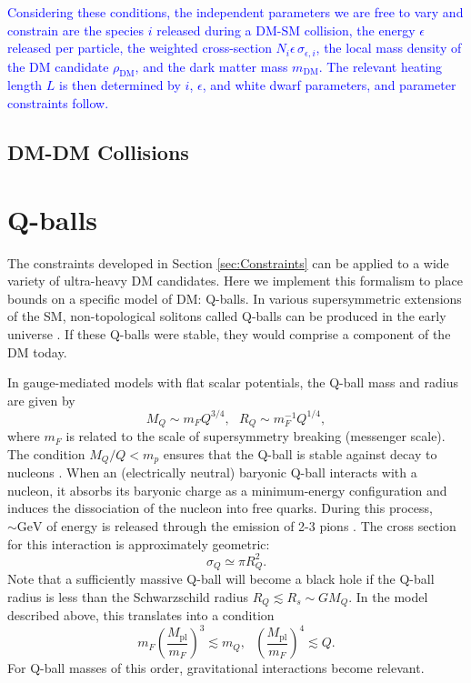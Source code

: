 \documentclass[twocolumn,showpacs,preprintnumbers,amsmath,amssymb,prd]{revtex4}
\newcommand{\Mpl}{M_{\text{pl}}}
\def\r{\right)}
\def\l{\left(}
\begin{document}
\textcolor{blue}{Considering these conditions, the independent parameters we are free to vary and constrain are the species $i$ released during a DM-SM collision, the energy $\epsilon$ released per particle, the weighted cross-section $N_i \epsilon\, \sigma_{\epsilon,i}$, the local mass density of the DM candidate $\rho_\text{DM}$, and the dark matter mass $m_\text{DM}$. The relevant heating length $L$ is then determined by $i$, $\epsilon$, and white dwarf parameters, and parameter constraints follow.}


\subsection{DM-DM Collisions}
\label{sec:CollisionConstraints}


\section{Q-balls}
\label{sec:ConcreteExamples}

The constraints developed in Section \ref{sec:Constraints} can be applied to a wide variety of ultra-heavy DM candidates. Here we implement this formalism to place bounds on a specific model of DM: Q-balls. In various supersymmetric extensions of the SM, non-topological solitons called Q-balls can be produced in the early universe \cite{Coleman:1985ki, Kusenko:1997si}. If these Q-balls were stable, they would comprise a component of the DM today. 

In gauge-mediated models with flat scalar potentials, the Q-ball mass and radius are given by
\begin{equation}
\label{eq:Qballprop}
M_Q \sim m_F Q^{3/4}, ~~~ R_Q \sim m_F^{-1} Q^{1/4},
\end{equation}
where $m_F$ is related to the scale of supersymmetry breaking (messenger scale). The condition $M_Q/Q < m_p$ ensures that the Q-ball is stable against decay to nucleons \cite{Dine:2003ax}. When an (electrically neutral) baryonic Q-ball interacts with a nucleon, it absorbs its baryonic charge as a minimum-energy configuration and induces the dissociation of the nucleon into free quarks. During this process, $\sim \text{GeV}$ of energy is released through the emission of 2-3 pions \cite{Dine:2003ax}. The cross section for this interaction is approximately geometric:
\begin{equation}
\sigma_Q \simeq \pi R_Q^2.
\end{equation}
Note that a sufficiently massive Q-ball will become a black hole if the Q-ball radius is less than the Schwarzschild radius $R_Q \lesssim R_s \sim G M_Q$. In the model described above, this translates into a condition
\begin{equation}
m_F \l\frac{\Mpl}{m_F}\r^3 \lesssim m_Q, ~~~ \l\frac{\Mpl}{m_F}\r^4 \lesssim Q.
\end{equation}
For Q-ball masses of this order, gravitational interactions become relevant.
\end{document}
